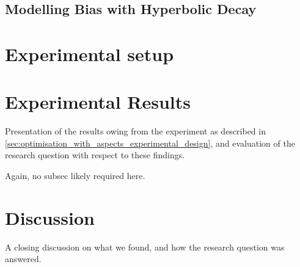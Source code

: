 



\subsection{Modelling Bias with Hyperbolic Decay}\label{subsec:optimisation_with_aspects_hyperbolicdecay}




\section{Experimental setup}



\section{Experimental Results}\label{sec:optimisation_with_aspects_experimental_results}

Presentation of the results owing from the experiment as described in
\cref{sec:optimisation_with_aspects_experimental_design}, and evaluation of the
research question with respect to these findings.

Again, no subsec likely required here.

\section{Discussion}\label{sec:optimisation_with_aspects_discussion}

A closing discussion on what we found, and how the research question was
answered.